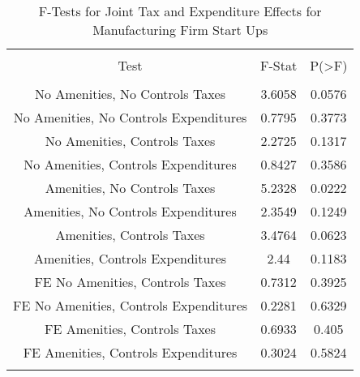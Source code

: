 
\begin{table}[!htbp] \centering 
  \caption{F-Tests for Joint Tax and Expenditure Effects for Manufacturing Firm Start Ups} 
  \label{31-33Ftests} 
\begin{tabular}{@{\extracolsep{5pt}} ccc} 
\\[-1.8ex]\hline 
\hline \\[-1.8ex] 
Test & F-Stat & P(\textgreater F) \\ 
\hline \\[-1.8ex] 
No Amenities, No Controls Taxes & 3.6058 & 0.0576 \\ 
No Amenities, No Controls Expenditures & 0.7795 & 0.3773 \\ 
No Amenities, Controls Taxes & 2.2725 & 0.1317 \\ 
No Amenities, Controls Expenditures & 0.8427 & 0.3586 \\ 
Amenities, No Controls Taxes & 5.2328 & 0.0222 \\ 
Amenities, No Controls Expenditures & 2.3549 & 0.1249 \\ 
Amenities, Controls Taxes & 3.4764 & 0.0623 \\ 
Amenities, Controls Expenditures & 2.44 & 0.1183 \\ 
FE No Amenities, Controls Taxes & 0.7312 & 0.3925 \\ 
FE No Amenities, Controls Expenditures & 0.2281 & 0.6329 \\ 
FE Amenities, Controls Taxes & 0.6933 & 0.405 \\ 
FE Amenities, Controls Expenditures & 0.3024 & 0.5824 \\ 
\hline \\[-1.8ex] 
\end{tabular} 
\end{table} 
